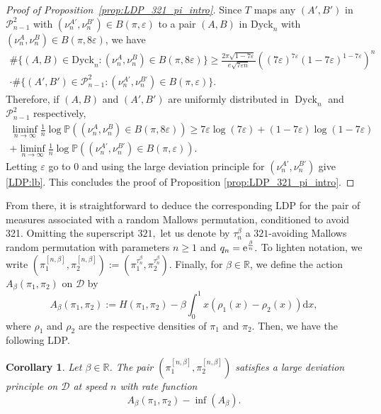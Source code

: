 \documentclass[a4paper,11pt]{amsart}
\newcommand{\eps}{\varepsilon}
\newcommand{\ee}{\textup{e}}
\newcommand{\R}{\mathbb R}
\DeclareMathOperator{\Dyck}{Dyck}
\newtheorem{cor}[thm]{Corollary}
\theoremstyle{definition}
\begin{document}
\begin{proof}[Proof of Proposition~\ref{prop:LDP_321_pi_intro}]
Since $T$ maps any $(A',B')$ in $\mathcal P_{n-1}^2$ with $(\nu_n^{A'},\nu_n^{B'}) \in B(\pi ,\varepsilon)$ to a pair $(A,B)$ in $\textrm{Dyck}_n$ with $(\nu_n^A,\nu_n^B) \in B(\pi , 8 \varepsilon)$, we have
\begin{multline}
    \# \{(A,B) \in \textrm{Dyck}_n : (\nu_n^A,\nu_n^B) \in B(\pi, 8\varepsilon)\} \ge
\frac{2\pi \sqrt{1-7\eps}}{ e \sqrt{7 \eps n}} ( (7\eps)^{7\eps} (1-7\eps)^{1-7\eps})^n \\
\cdot \# \{(A',B') \in \mathcal P_{n-1}^2: (\nu_n^{A'},\nu_n^{B'}) \in B(\pi ,\varepsilon)\}.
\end{multline}
Therefore, if $(A,B)$ and $(A',B')$ are uniformly distributed  in $\Dyck_n$ and $\mathcal P_{n-1}^2$ respectively,
\begin{multline*}
    \liminf_{n \to \infty} \frac 1 n \log \mathbb P\left( (\nu_n^A,\nu_n^B) \in B(\pi, 8\varepsilon) \right) \ge 7\eps \log(7\eps) +(1-7\eps)\log(1-7\eps) \\ + \liminf_{n \to \infty} \frac 1 n \log\mathbb P\left( (\nu_n^{A'},\nu_n^{B'}) \in B(\pi ,\varepsilon) \right) .
\end{multline*}
Letting $\eps$ go to $0$ and using the large deviation principle for $(\nu_n^{A'},\nu_n^{B'})$ give \eqref{LDP:lb}. 
This concludes the proof of Proposition \ref{prop:LDP_321_pi_intro}.
\end{proof}


From there, it is straightforward to deduce the corresponding LDP for the pair of measures associated
with a random Mallows permutation, conditioned to avoid 321. 
Omitting the superscript $321,$ let us denote by $\tau_n^{\beta}$
a $321$-avoiding Mallows random permutation with parameters $n \geq 1$ and $q_n = \ee^{\frac{\beta}{n}}.$
To lighten notation, we write $(\pi_1^{[n,\beta]}, \pi_2^{[n,\beta]}) := \left( \pi_1^{\tau_n^{\beta}}, \pi_2^{\tau_n^{\beta}} \right)$.
Finally, for $\beta \in \R$, we define the action $A_{\beta}(\pi_1, \pi_2)$ on $\mathcal{D}$ by
\begin{equation}\label{eqn:defn_action_321}
A_{\beta}(\pi_1, \pi_2) := H(\pi_1, \pi_2) - \beta \int_0^1 x \left( \rho_1(x)-\rho_2(x) \right) \mathrm{d}x,
\end{equation}
where $\rho_1$ and $\rho_2$ are the respective densities of $\pi_1$ and $\pi_2$. Then, we have the following LDP.
\begin{cor}\label{cor:LDP_Mallows_321}
    Let $\beta \in \R$.
    The pair $(\pi_1^{[n,\beta]}, \pi_2^{[n,\beta]})$ satisfies a large deviation principle on $\mathcal D$ at speed $n$ with rate function
    \[ A_{\beta}(\pi_1,\pi_2)-\inf(A_{\beta}).\]
\end{cor}
\end{document}
